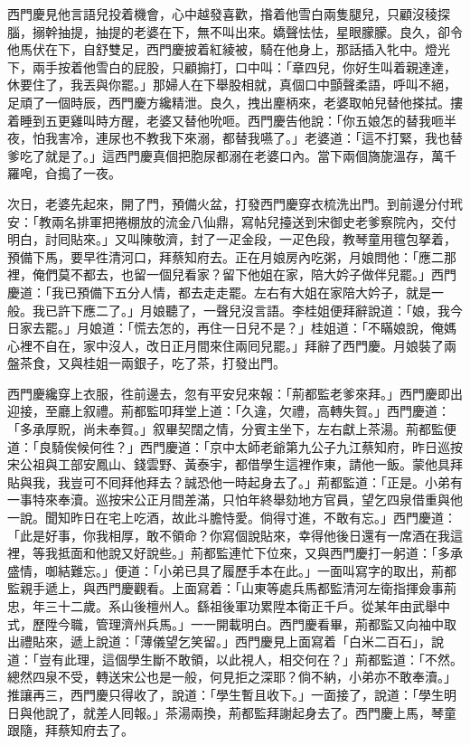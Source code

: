 西門慶見他言語兒投着機會，心中越發喜歡，揝着他雪白兩隻腿兒，{}只顧沒稜探腦，搦幹抽提，抽提的老婆在下，無不叫出來。嬌聲怯怯，星眼朦朦。良久，卻令他馬伏在下，自舒雙足，西門慶披着紅綾被，騎在他身上，那話插入牝中。燈光下，兩手按着他雪白的屁股，只顧搧打，口中叫：「章四兒，你好生叫着親達達，休要住了，我丟與你罷。」那婦人在下舉股相就，{}真個口中顫聲柔語，呼叫不絕，足頑了一個時辰，西門慶方纔精泄。良久，拽出麈柄來，老婆取帕兒替他搽拭。摟着睡到五更雞叫時方醒，老婆又替他吮咂。西門慶告他說：「你五娘怎的替我咂半夜，怕我害冷，連尿也不教我下來溺，都替我嚥了。」{}老婆道：「這不打緊，我也替爹吃了就是了。」{}這西門慶真個把胞尿都溺在老婆口內。{}當下兩個旖旎溫存，萬千羅唣，㒲搗了一夜。

次日，老婆先起來，開了門，預備火盆，打發西門慶穿衣梳洗出門。到前邊分付玳安：「教兩名排軍把捲棚放的流金八仙鼎，寫帖兒擡送到宋御史老爹察院內，交付明白，討囘貼來。」又叫陳敬濟，封了一疋金段，一疋色段，教琴童用氊包拏着，預備下馬，要早徃清河口，拜蔡知府去。正在月娘房內吃粥，月娘問他：「應二那裡，俺們莫不都去，也留一個兒看家？留下他姐在家，陪大妗子做伴兒罷。」西門慶道：「我已預備下五分人情，都去走走罷。左右有大姐在家陪大妗子，就是一般。我已許下應二了。」月娘聽了，一聲兒沒言語。李桂姐便拜辭說道：「娘，我今日家去罷。」月娘道：「慌去怎的，再住一日兒不是？」桂姐道：「不瞞娘說，俺媽心裡不自在，家中沒人，改日正月間來住兩囘兒罷。」拜辭了西門慶。月娘裝了兩盤茶食，又與桂姐一兩銀子，吃了茶，打發出門。

西門慶纔穿上衣服，徃前邊去，忽有平安兒來報：「荊都監老爹來拜。」西門慶即出迎接，至廳上叙禮。荊都監叩拜堂上道：「久違，欠禮，高轉失賀。」西門慶道：「多承厚貺，尚未奉賀。」叙畢契闊之情，分賓主坐下，左右獻上茶湯。荊都監便道：「良騎俟候何徃？」西門慶道：「京中太師老爺第九公子九江蔡知府，昨日巡按宋公祖與工部安鳳山、錢雲野、黃泰宇，都借學生這裡作東，請他一飯。蒙他具拜貼與我，我豈可不囘拜他拜去？誠恐他一時起身去了。」{}荊都監道：「正是。小弟有一事特來奉瀆。巡按宋公正月間差滿，只怕年終舉劾地方官員，望乞四泉借重與他一說。聞知昨日在宅上吃酒，故此斗膽恃愛。倘得寸進，不敢有忘。」西門慶道：「此是好事，你我相厚，敢不領命？你寫個說貼來，幸得他後日還有一席酒在我這裡，等我抵面和他說又好說些。」荊都監連忙下位來，又與西門慶打一躬道：「多承盛情，啣結難忘。」便道：「小弟已具了履歷手本在此。」一面叫寫字的取出，荊都監親手遞上，與西門慶觀看。上面寫着：「山東等處兵馬都監清河左衛指揮僉事荊忠，年三十二歲。系山後檀州人。繇祖後軍功累陞本衛正千戶。從某年由武舉中式，歷陞今職，管理濟州兵馬。」一一開載明白。西門慶看畢，荊都監又向袖中取出禮貼來，遞上說道：「薄儀望乞笑留。」{}西門慶見上面寫着「白米二百石」，說道：「豈有此理，這個學生斷不敢領，以此視人，相交何在？」荊都監道：「不然。總然四泉不受，轉送宋公也是一般，何見拒之深耶？倘不納，小弟亦不敢奉瀆。」推讓再三，西門慶只得收了，說道：「學生暫且收下。」一面接了，說道：「學生明日與他說了，就差人囘報。」茶湯兩換，荊都監拜謝起身去了。西門慶上馬，琴童跟隨，拜蔡知府去了。

